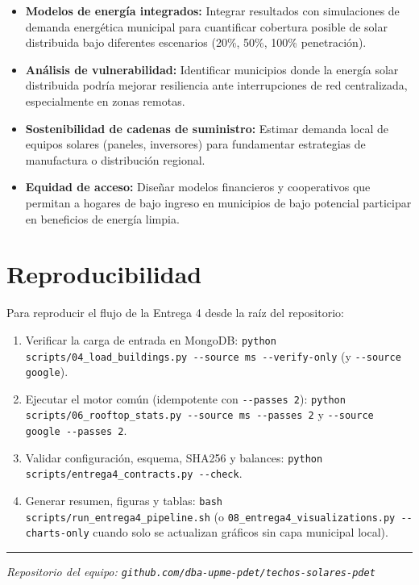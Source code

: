 \documentclass[11pt, a4paper]{article}
\begin{document}
\begin{itemize}
    \item \textbf{Modelos de energía integrados:} Integrar resultados con simulaciones de demanda energética municipal para cuantificar cobertura posible de solar distribuida bajo diferentes escenarios (20\%, 50\%, 100\% penetración).

    \item \textbf{Análisis de vulnerabilidad:} Identificar municipios donde la energía solar distribuida podría mejorar resiliencia ante interrupciones de red centralizada, especialmente en zonas remotas.

    \item \textbf{Sostenibilidad de cadenas de suministro:} Estimar demanda local de equipos solares (paneles, inversores) para fundamentar estrategias de manufactura o distribución regional.

    \item \textbf{Equidad de acceso:} Diseñar modelos financieros y cooperativos que permitan a hogares de bajo ingreso en municipios de bajo potencial participar en beneficios de energía limpia.
\end{itemize}



\section{Reproducibilidad}

Para reproducir el flujo de la Entrega 4 desde la raíz del repositorio:

\begin{enumerate}
    \item Verificar la carga de entrada en MongoDB: \texttt{python scripts/04\_load\_buildings.py -{}-source ms -{}-verify-only} (y \texttt{-{}-source google}).
    \item Ejecutar el motor común (idempotente con \texttt{-{}-passes 2}): \texttt{python scripts/06\_rooftop\_stats.py -{}-source ms -{}-passes 2} y \texttt{-{}-source google -{}-passes 2}.
    \item Validar configuración, esquema, SHA256 y balances: \texttt{python scripts/entrega4\_contracts.py -{}-check}.
    \item Generar resumen, figuras y tablas: \texttt{bash scripts/run\_entrega4\_pipeline.sh} (o \texttt{08\_entrega4\_visualizations.py -{}-charts-only} cuando solo se actualizan gráficos sin capa municipal local).
\end{enumerate}

\vspace{1.2cm}
\hrule
\vspace{0.4cm}
\textit{Repositorio del equipo: \texttt{github.com/dba-upme-pdet/techos-solares-pdet}}
\end{document}
